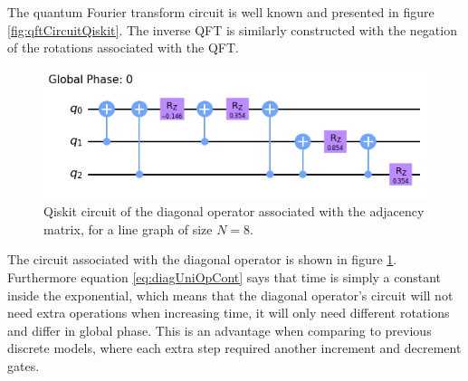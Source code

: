 \documentclass[../../dissertation.tex]{subfiles}
\begin{document}
The quantum Fourier transform circuit is well known and presented in figure
\ref{fig:qftCircuitQiskit}. The inverse QFT is similarly constructed with the
negation of the rotations associated with the QFT.\par
\begin{figure}[!h]
	\centering
	\includegraphics[scale=0.50]{img/Qiskit/ContQuantumWalk/Circuits/circDiag_N3_S1.png}
	\caption{Qiskit circuit of the diagonal operator associated with the adjacency matrix, for a line graph of size $N=8$.}
	\label{fig:diagCircuitQiskit}
\end{figure}
The circuit associated with the diagonal operator is shown in figure
\ref{fig:diagCircuitQiskit}. Furthermore equation \ref{eq:diagUniOpCont} says
that time is simply a constant inside the exponential, which means that the
diagonal operator's circuit will not need extra operations when increasing
time, it will only need different rotations and differ in global phase.  This
is an advantage when comparing to previous discrete models,  where each extra
step required another increment and decrement gates.\par
\end{document}
